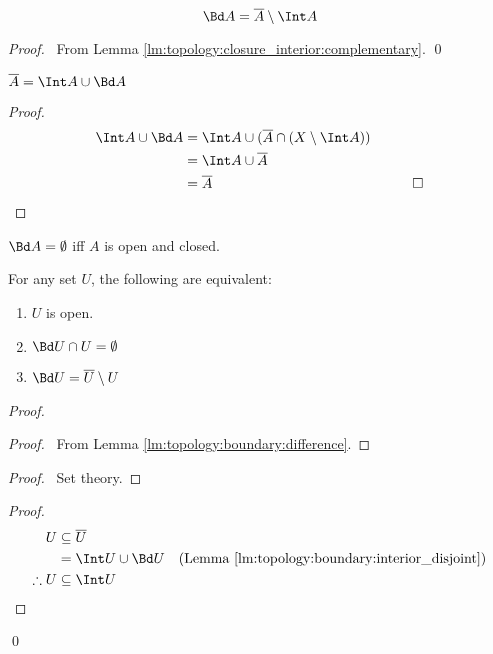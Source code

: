 \begin{lm}
  \label{lm:topology:boundary:difference}
  \[ \Bd A = \overline{A} \setminus \Int A \]
\end{lm}

\begin{proof}
  \pf\ From Lemma \ref{lm:topology:closure_interior:complementary}. \qed
\end{proof}

\begin{lm}
  \label{lm:topology:boundary:interior_disjoint}
  $\overline{A} = \Int A \cup \Bd A$
\end{lm}

\begin{proof}
  \pf
  \begin{align*}
    \Int A \cup \Bd A & = \Int A \cup (\overline{A} \cap (X \setminus \Int
    A))
    \\
    & = \Int A \cup \overline{A} \\
    & = \overline{A} & \qed
  \end{align*}
\end{proof}

\begin{cor}
  $\Bd A = \emptyset$ iff $A$ is open and closed.
\end{cor}

\begin{lm}
  For any set $U$, the following are equivalent:
  \begin{enumerate}
    \item $U$ is open.
    \item $\Bd U \cap U = \emptyset$
    \item $\Bd U = \overline{U} \setminus U$
  \end{enumerate}
\end{lm}

\begin{proof}
  \pf
  \begin{proof}
    \pf\ From Lemma \ref{lm:topology:boundary:difference}.
  \end{proof}
  \begin{proof}
    \pf\ Set theory.
  \end{proof}
  \begin{proof}
    \pf
    \begin{align*}
      U & \subseteq \overline{U} \\
      & = \Int U \cup \Bd U & (\text{Lemma
        \ref{lm:topology:boundary:interior_disjoint}}) \\
      \therefore U & \subseteq \Int U
    \end{align*}
  \end{proof}
  \qed
\end{proof}

